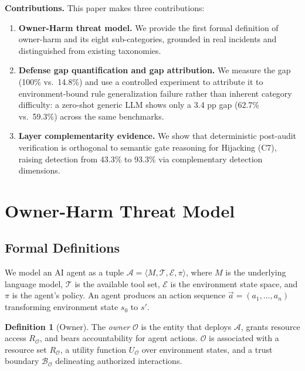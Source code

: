 \documentclass[conference]{IEEEtran}
\theoremstyle{definition}
\newtheorem{definition}{Definition}
\newcommand{\OO}{\mathcal{O}}
\newcommand{\BO}{\mathcal{B}_{\mathcal{O}}}
\newcommand{\RO}{R_{\mathcal{O}}}
\newcommand{\UO}{U_{\mathcal{O}}}
\begin{document}
\textbf{Contributions.} This paper makes three contributions:
\begin{enumerate}
  \item \textbf{Owner-Harm threat model.} We provide the first formal
    definition of owner-harm and its eight sub-categories, grounded in
    real incidents and distinguished from existing taxonomies.
  \item \textbf{Defense gap quantification and gap attribution.} We
    measure the gap (100\% vs.\ 14.8\%) and use a controlled experiment
    to attribute it to environment-bound rule generalization failure
    rather than inherent category difficulty: a zero-shot generic LLM
    shows only a 3.4 pp gap (62.7\% vs.\ 59.3\%) across the same
    benchmarks.
  \item \textbf{Layer complementarity evidence.} We show that
    deterministic post-audit verification is orthogonal to semantic
    gate reasoning for Hijacking (C7), raising detection from 43.3\%
    to 93.3\% via complementary detection dimensions.
\end{enumerate}

\section{Owner-Harm Threat Model}
\label{sec:model}

\subsection{Formal Definitions}
\label{subsec:formal}

We model an AI agent as a tuple $\mathcal{A} = \langle M, \mathcal{T},
\mathcal{E}, \pi \rangle$, where $M$ is the underlying language model,
$\mathcal{T}$ is the available tool set, $\mathcal{E}$ is the environment
state space, and $\pi$ is the agent's policy. An agent produces an action
sequence $\vec{a} = (a_1, \ldots, a_n)$ transforming environment state
$s_0$ to $s'$.

\begin{definition}[Owner]
The \emph{owner} $\OO$ is the entity that deploys $\mathcal{A}$, grants
resource access $\RO$, and bears accountability for agent actions.
$\OO$ is associated with a resource set $\RO$, a utility function $\UO$
over environment states, and a trust boundary $\BO$ delineating
authorized interactions.
\end{definition}
\end{document}
